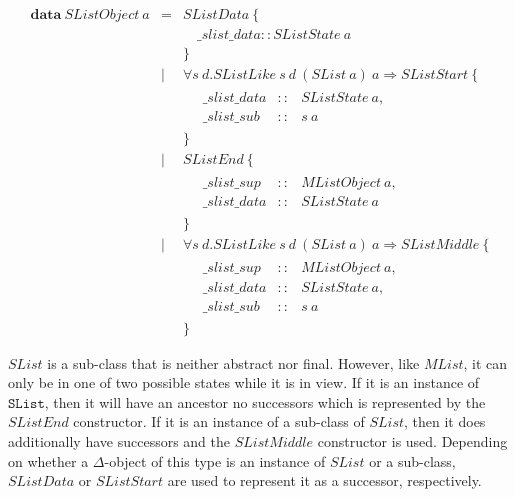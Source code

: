 \documentclass[runningheads,a4paper]{llncs}
\begin{document}
\begin{displaymath}
\begin{array}{lcl}
\mathbf{data}~\mathit{SListObject}~a & = & \mathit{SListData}~\{ \\ 
 & & \quad \_\mathit{slist}\_\mathit{data} :: \mathit{SListState}~a\\
 & & \} \\
 & \mid & \forall s~d.\mathit{SListLike}~s~d~(\mathit{SList}~a)~a \Rightarrow \mathit{SListStart}~\{\\
 & & \quad \begin{array}{lcl}
 \_\mathit{slist}\_\mathit{data} & :: & \mathit{SListState}~a, \\
 \_\mathit{slist}\_\mathit{sub}  & :: & s~a
 \end{array}\\
 & & \} \\
 & \mid & \mathit{SListEnd}~\{\\
  & & \quad \begin{array}{lcl}
  \_\mathit{slist}\_\mathit{sup}  & :: & \mathit{MListObject}~a, \\
  \_\mathit{slist}\_\mathit{data} & :: & \mathit{SListState}~a
  \end{array}\\
  & & \} \\
  & \mid & \forall s~d.\mathit{SListLike}~s~d~(\mathit{SList}~a)~a \Rightarrow \mathit{SListMiddle}~\{\\
   & & \quad \begin{array}{lcl}
   \_\mathit{slist}\_\mathit{sup}  & :: & \mathit{MListObject}~a, \\
   \_\mathit{slist}\_\mathit{data} & :: & \mathit{SListState}~a, \\
   \_\mathit{slist}\_\mathit{sub}  & :: & s~a
   \end{array}\\
   & & \}
\end{array}
\end{displaymath}

$\mathit{SList}$ is a sub-class that is neither abstract nor final. However, like $\mathit{MList}$, it can only be in one of two possible states while it is in view. If it is an instance of $\mathtt{SList}$, then it will have an ancestor no successors which is represented by the $\mathit{SListEnd}$ constructor. If it is an instance of a sub-class of $\mathit{SList}$, then it does additionally have successors and the $\mathit{SListMiddle}$ constructor is used. Depending on whether a $\Delta$-object of this type is an instance of $\mathit{SList}$ or a sub-class, $\mathit{SListData}$ or $\mathit{SListStart}$ are used to represent it as a successor, respectively.
\end{document}
